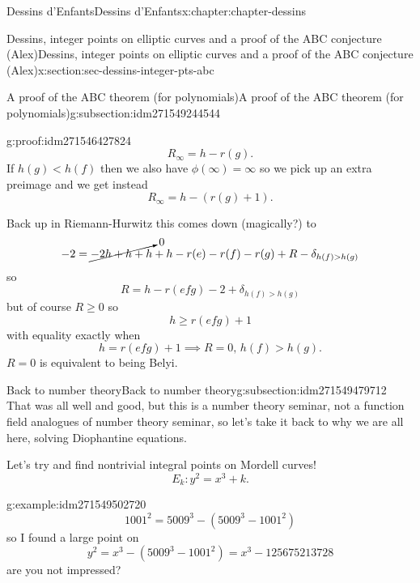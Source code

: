 \documentclass[oneside,10pt,]{book}
\numberwithin{equation}{section}
\newcommand{\lt}{<}
\newcommand{\gt}{>}
\begin{document}
\begin{chapterptx}{Dessins d'Enfants}{}{Dessins d'Enfants}{}{}{x:chapter:chapter-dessins}
\begin{sectionptx}{Dessins, integer points on elliptic curves and a proof of the ABC conjecture (Alex)}{}{Dessins, integer points on elliptic curves and a proof of the ABC conjecture (Alex)}{}{}{x:section:sec-dessins-integer-pts-abc}
\begin{subsectionptx}{A proof of the ABC theorem (for polynomials)}{}{A proof of the ABC theorem (for polynomials)}{}{}{g:subsection:idm271549244544}
\begin{proofptx}{}{g:proof:idm271546427824}
\begin{equation*}
R_\infty = h - r(g)\text{.}
\end{equation*}
If \(h(g) \lt h(f)\) then we also have \(\phi(\infty) = \infty\) so we pick up an extra preimage and we get instead%
\begin{equation*}
R_\infty = h - (r(g) + 1)\text{.}
\end{equation*}
%
\par
Back up in Riemann-Hurwitz this comes down (magically?) to%
\begin{equation*}
-2 = \cancelto{0}{-2 h + h + h} + h - r(e) -r(f) - r(g) + R - \delta_{h(f) \gt h(g)}
\end{equation*}
so%
\begin{equation*}
R = h - r(efg) - 2 + \delta_{h(f) \gt h(g)}
\end{equation*}
but of course \(R \ge 0\) so%
\begin{equation*}
h \ge r(efg) + 1
\end{equation*}
with equality exactly when%
\begin{equation*}
h = r(efg) + 1 \implies R = 0,\, h(f) \gt h(g)\text{.}
\end{equation*}
\(R= 0\) is equivalent to being Belyi.%
\end{proofptx}
\end{subsectionptx}
%
%
\typeout{************************************************}
\typeout{************************************************}
%
\begin{subsectionptx}{Back to number theory}{}{Back to number theory}{}{}{g:subsection:idm271549479712}
That was all well and good, but this is a number theory seminar, not a function field analogues of number theory seminar, so let's take it back to why we are all here, solving Diophantine equations.%
\par
Let's try and find nontrivial integral points on Mordell curves!%
\begin{equation*}
E_k\colon y^2 = x^3 + k\text{.}
\end{equation*}
%
\begin{example}{}{g:example:idm271549502720}%
%
\begin{equation*}
1001^2 = 5009^3 - (5009^3 - 1001^2)
\end{equation*}
so I found a large point on%
\begin{equation*}
y^2 = x^3 - (5009^3 - 1001^2) = x^3 - 125675213728
\end{equation*}
are you not impressed?%
\end{example}

\end{subsectionptx}
\end{sectionptx}
\end{chapterptx}
\end{document}
